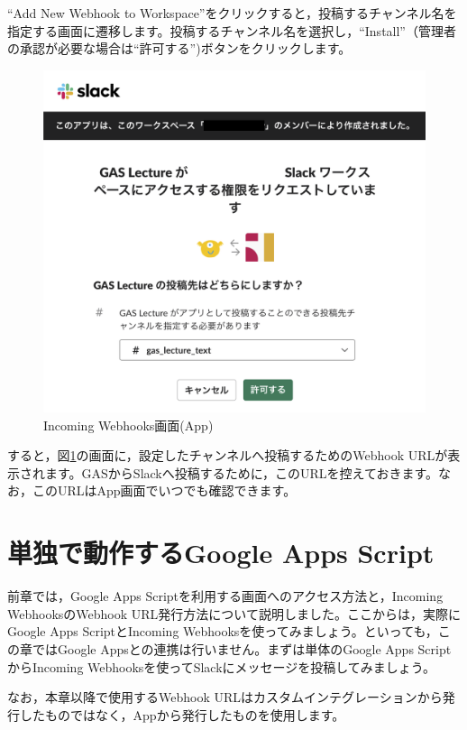 \documentclass[uplatex,a4j]{jsarticle}
\begin{document}
``Add New Webhook to Workspace''をクリックすると，投稿するチャンネル名を指定する画面に遷移します。投稿するチャンネル名を選択し，``Install''（管理者の承認が必要な場合は``許可する'')ボタンをクリックします。

\begin{figure}[H]
 \centering
 \includegraphics[keepaspectratio, scale=0.6]{images/create_incoming_webhooks.png}
 \caption{Incoming Webhooks画面(App)}
 \label{fig:create_new_app4}
\end{figure}

すると，図\ref{fig:create_new_app4}の画面に，設定したチャンネルへ投稿するためのWebhook URLが表示されます。GASからSlackへ投稿するために，このURLを控えておきます。なお，このURLはApp画面でいつでも確認できます。

\clearpage
\section{単独で動作するGoogle Apps Script}

前章では，Google Apps Scriptを利用する画面へのアクセス方法と，Incoming WebhooksのWebhook URL発行方法について説明しました。ここからは，実際にGoogle Apps ScriptとIncoming Webhooksを使ってみましょう。といっても，この章ではGoogle Appsとの連携は行いません。まずは単体のGoogle Apps ScriptからIncoming Webhooksを使ってSlackにメッセージを投稿してみましょう。

なお，本章以降で使用するWebhook URLはカスタムインテグレーションから発行したものではなく，Appから発行したものを使用します。
\end{document}
